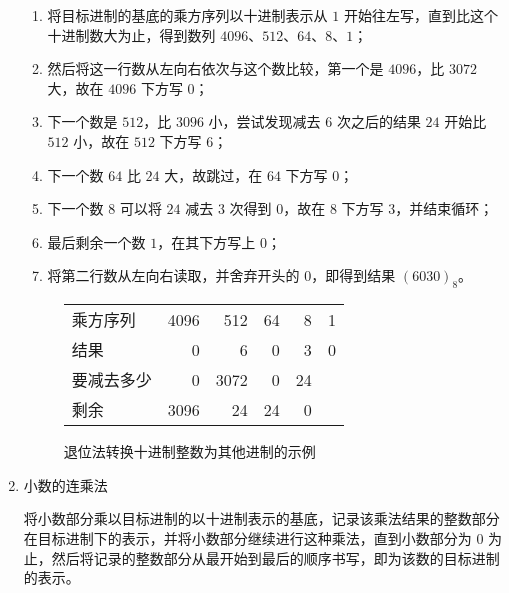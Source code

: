 \begin{enumerate}
                    \begin{enumerate}
                        \item 将目标进制的基底的乘方序列以十进制表示从 $1$ 开始往左写，直到比这个十进制数大为止，得到数列 $4096$、$512$、$64$、$8$、$1$；
                        \item 然后将这一行数从左向右依次与这个数比较，第一个是 $4096$，比 $3072$ 大，故在 $4096$ 下方写 $0$；
                        \item 下一个数是 $512$，比 $3096$ 小，尝试发现减去 $6$ 次之后的结果 $24$ 开始比 $512$ 小，故在 $512$ 下方写 $6$；
                        \item 下一个数 $64$ 比 $24$ 大，故跳过，在 $64$ 下方写 $0$；
                        \item 下一个数 $8$ 可以将 $24$ 减去 $3$ 次得到 $0$，故在 $8$ 下方写 $3$，并结束循环；
                        \item 最后剩余一个数 $1$，在其下方写上 $0$；
                        \item 将第二行数从左向右读取，并舍弃开头的 $0$，即得到结果 $(6030)_8$。
                    \end{enumerate}

                    \begin{figure}
                        \centering
                        \begin{tabular}{lrrrrr}
                            乘方序列     & 4096 &  512 & 64 &  8 & 1 \\
                            结果         & 0    &    6 &  0 &  3 & 0 \\ \hline
                            要减去多少   & 0    & 3072 &  0 & 24 &   \\
                            剩余         & 3096 &   24 & 24 &  0 &
                        \end{tabular}
                        \caption{退位法转换十进制整数为其他进制的示例}
                        \label{fig:ArithBasics/positional-notation-presentation-and-conversion/conversion/from-decimal/descending-subtraction-integer}
                    \end{figure}
                \item 小数的连乘法

                    将小数部分乘以目标进制的以十进制表示的基底，记录该乘法结果的整数部分在目标进制下的表示，并将小数部分继续进行这种乘法，直到小数部分为 0 为止，然后将记录的整数部分从最开始到最后的顺序书写，即为该数的目标进制的表示。


\end{enumerate}
